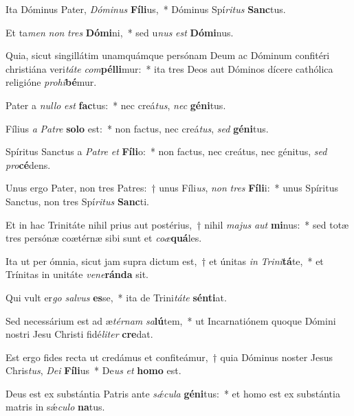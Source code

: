 \item Ita Dóminus Pater, \textit{Dó}\textit{mi}\textit{nus} \textbf{Fí}\textbf{li}us,~* Dóminus Spí\textit{ri}\textit{tus} \textbf{Sanc}tus.
\item Et ta\textit{men} \textit{non} \textit{tres} \textbf{Dó}\textbf{mi}ni,~* sed u\textit{nus} \textit{est} \textbf{Dó}\textbf{mi}nus.
\item Quia, sicut singillátim unamquámque persónam Deum ac Dóminum confitéri christiána veri\textit{tá}\textit{te} \textit{com}\textbf{pél}\textbf{li}mur:~* ita tres Deos aut Dóminos dícere cathólica religióne \textit{pro}\textit{hi}\textbf{bé}mur.
\item Pater a \textit{nul}\textit{lo} \textit{est} \textbf{fac}tus:~* nec creá\textit{tus}, \textit{nec} \textbf{gé}\textbf{ni}tus.
\item Fílius \textit{a} \textit{Pa}\textit{tre} \textbf{so}\textbf{lo} est:~* non factus, nec creá\textit{tus}, \textit{sed} \textbf{gé}\textbf{ni}tus.
\item Spíritus Sanctus a \textit{Pa}\textit{tre} \textit{et} \textbf{Fí}\textbf{li}o:~* non factus, nec creátus, nec génitus, \textit{sed} \textit{pro}\textbf{cé}dens.
\item Unus ergo Pater, non tres Patres:~† unus Fíli\textit{us}, \textit{non} \textit{tres} \textbf{Fí}\textbf{li}i:~* unus Spíritus Sanctus, non tres Spí\textit{ri}\textit{tus} \textbf{Sanc}ti.
\item Et in hac Trinitáte nihil prius aut postérius,~† nihil \textit{ma}\textit{jus} \textit{aut} \textbf{mi}nus:~* sed totæ tres persónæ coætérnæ sibi sunt et \textit{co}\textit{æ}\textbf{quá}les.
\item Ita ut per ómnia, sicut jam supra dictum est,~† et únitas \textit{in} \textit{Tri}\textit{ni}\textbf{tá}te,~* et Trínitas in unitáte \textit{ve}\textit{ne}\textbf{rán}\textbf{da} sit.
\item Qui vult er\textit{go} \textit{sal}\textit{vus} \textbf{es}se,~* ita de Trini\textit{tá}\textit{te} \textbf{sén}\textbf{ti}at.
\item Sed necessárium est ad æ\textit{tér}\textit{nam} \textit{sa}\textbf{lú}tem,~* ut Incarnatiónem quoque Dómini nostri Jesu Christi fidé\textit{li}\textit{ter} \textbf{cre}dat.
\item Est ergo fides recta ut credámus et confiteámur,~† quia Dóminus noster Jesus Chris\textit{tus}, \textit{De}\textit{i} \textbf{Fí}\textbf{li}us~* De\textit{us} \textit{et} \textbf{ho}\textbf{mo} est.
\item Deus est ex substántia Patris ante \textit{sǽ}\textit{cu}\textit{la} \textbf{gé}\textbf{ni}tus:~* et homo est ex substántia matris in sǽ\textit{cu}\textit{lo} \textbf{na}tus.
